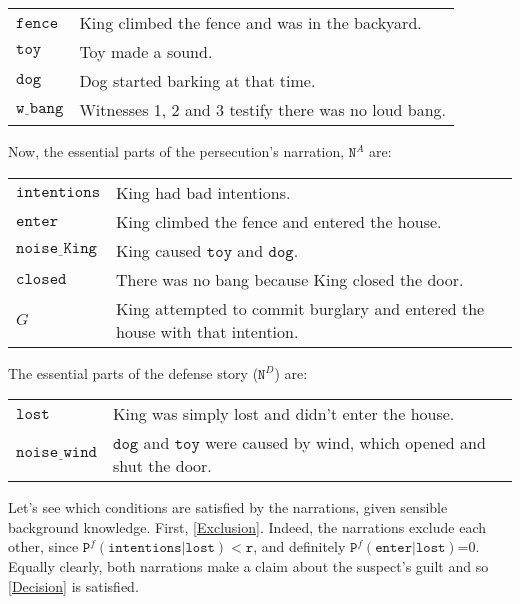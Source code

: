 \documentclass[10pt,leqno]{article}
\newcommand{\prcon}[3]{\mbox{$\mathtt{P}^{#3}(\mathtt{#1}\vert \mathtt{#2})$}}
\begin{document}
\begin{center}
\begin{tabular}{lp{8cm}}
$\mathtt{fence} $ & King climbed the fence and was in the backyard. \\
$\mathtt{toy}$ &  Toy made a sound.\\
$\mathtt{dog}$ & Dog started barking at that time.\\
$\mathtt{w\underline{\,\,}bang} $ & Witnesses 1, 2 and 3 testify there was no loud bang. 
\end{tabular}\end{center}


Now, the essential parts of the  persecution's narration, $\mathtt{N}^A$ are:

\begin{center}
\begin{tabular}{lp{8cm}}
$\mathtt{intentions}$ & King had bad intentions.\\
$\mathtt{enter} $  & King climbed the fence and entered the house.\\
$\mathtt{noise\underline{\,\,}King}$ & King caused $\mathtt{toy}$ and $\mathtt{dog}$.\\
$\mathtt{closed} $ & There was no bang because King closed the door.\\
$G$ & King attempted to commit burglary and entered the house with that intention.
\end{tabular}\end{center}


The essential parts of the defense story ($\mathtt{N}^D$) are:

\begin{center}
\begin{tabular}{lp{8cm}}
$\mathtt{lost}$ & King was simply lost and didn't enter the house. \\
$ \mathtt{noise\underline{\,\,}wind} $  & $\mathtt{dog}$ and $\mathtt{toy}$ were caused by wind, which opened and shut the door. \\
\end{tabular}\end{center}

Let's see which conditions  are satisfied by the narrations, given sensible background knowledge.  First, \eqref{Exclusion}. Indeed, the narrations exclude each other, since 
$\prcon{intentions}{lost}{f}<\mathtt{r}$, and definitely \prcon{enter}{lost}{f}=0. Equally clearly, both narrations make a claim about the suspect's guilt   and so \eqref{Decision} is satisfied.
\end{document}
